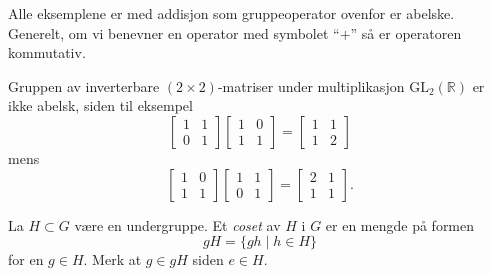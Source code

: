 \begin{example}
    Alle eksemplene er med addisjon som gruppeoperator ovenfor er abelske.
    Generelt, om vi benevner en operator med symbolet ``$+$'' så er operatoren
    kommutativ.
\end{example}

\begin{example}
    Gruppen av inverterbare $(2\times 2)$-matriser under multiplikasjon
    $\mathrm{GL}_2(\mathbb R)$
    er ikke abelsk, siden til eksempel
    \[
        \begin{bmatrix}
            1 & 1\\
            0 & 1
        \end{bmatrix}
        \begin{bmatrix}
            1 & 0\\
            1 & 1
        \end{bmatrix}
        =
        \begin{bmatrix}
            1 & 1\\
            1 & 2
        \end{bmatrix}
    \]
    mens
    \[
        \begin{bmatrix}
            1 & 0\\
            1 & 1
        \end{bmatrix}
        \begin{bmatrix}
            1 & 1\\
            0 & 1
        \end{bmatrix}
        =
        \begin{bmatrix}
            2 & 1\\
            1 & 1
        \end{bmatrix}.
    \]
\end{example}

\begin{definition}
    La $H\subset G$ være en undergruppe.
    Et \textit{coset} av $H$ i $G$ er en mengde på formen
    \[
        gH = \{gh\mid h\in H\}
    \]
    for en $g\in H$.
    Merk at $g\in gH$ siden $e\in H$.
\end{definition}

